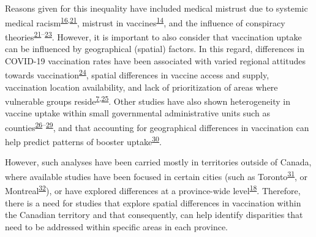 \documentclass[
  letterpaper,
  DIV=11,
  numbers=noendperiod]{scrartcl}
\begin{document}
Reasons given for this inequality have included medical mistrust due to
systemic medical
racism\textsuperscript{\protect\hyperlink{ref-stoler2021}{16},\protect\hyperlink{ref-mosby2021}{21}},
mistrust in
vaccines\textsuperscript{\protect\hyperlink{ref-willis2021}{14}}, and
the influence of conspiracy
theories\textsuperscript{\protect\hyperlink{ref-mosby2021}{21}--\protect\hyperlink{ref-freeman2020}{23}}.
However, it is important to also consider that vaccination uptake can be
influenced by geographical (spatial) factors. In this regard,
differences in COVID-19 vaccination rates have been associated with
varied regional attitudes towards
vaccination\textsuperscript{\protect\hyperlink{ref-malik2020}{24}},
spatial differences in vaccine access and supply, vaccination location
availability, and lack of prioritization of areas where vulnerable
groups
reside\textsuperscript{\protect\hyperlink{ref-bogoch2022}{7},\protect\hyperlink{ref-nguyen2021}{25}}.
Other studies have also shown heterogeneity in vaccine uptake within
small governmental administrative units such as
counties\textsuperscript{\protect\hyperlink{ref-mollalo2021}{26}--\protect\hyperlink{ref-bhuiyan2022}{29}},
and that accounting for geographical differences in vaccination can help
predict patterns of booster
uptake\textsuperscript{\protect\hyperlink{ref-wood2022}{30}}.

However, such analyses have been carried mostly in territories outside
of Canada, where available studies have been focused in certain cities
(such as Toronto\textsuperscript{\protect\hyperlink{ref-choi2021}{31}},
or Montreal\textsuperscript{\protect\hyperlink{ref-mckinnon2021}{32}}),
or have explored differences at a province-wide
level\textsuperscript{\protect\hyperlink{ref-guay2022}{18}}. Therefore,
there is a need for studies that explore spatial differences in
vaccination within the Canadian territory and that consequently, can
help identify disparities that need to be addressed within specific
areas in each province.
\end{document}
